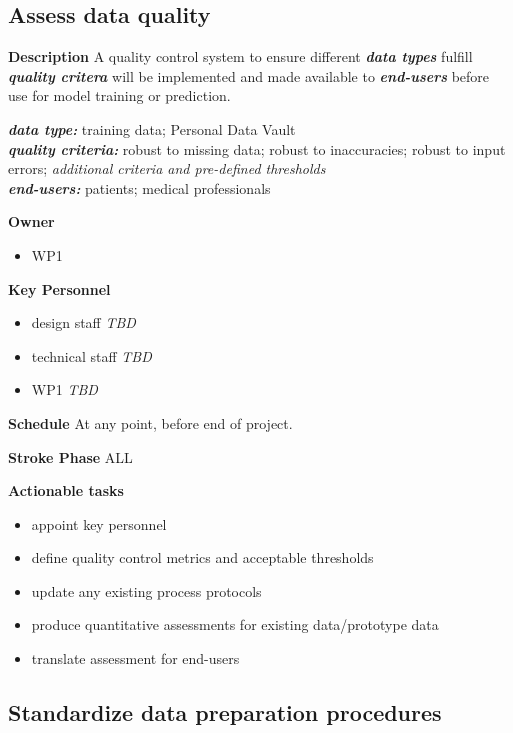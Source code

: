 \documentclass[
  letterpaper,
  DIV=11,
  numbers=noendperiod]{scrreport}
\providecommand{\tightlist}{%
  \setlength{\itemsep}{0pt}\setlength{\parskip}{0pt}}\usepackage{longtable,booktabs,array}
\begin{document}
\hypertarget{assess-data-quality}{%
\subsection{Assess data quality}\label{assess-data-quality}}

\textbf{Description} A quality control system to ensure different
\textbf{\emph{data types}} fulfill \textbf{\emph{quality critera}} will
be implemented and made available to \textbf{\emph{end-users}} before
use for model training or prediction.

\textbf{\emph{data type:}} training data; Personal Data Vault\\
\textbf{\emph{quality criteria:}} robust to missing data; robust to
inaccuracies; robust to input errors; \emph{additional criteria and
pre-defined thresholds}\\
\textbf{\emph{end-users:}} patients; medical professionals

\textbf{Owner}

\begin{itemize}
\tightlist
\item
  WP1
\end{itemize}

\textbf{Key Personnel}

\begin{itemize}
\tightlist
\item
  design staff \emph{TBD}
\item
  technical staff \emph{TBD}
\item
  WP1 \emph{TBD}
\end{itemize}

\textbf{Schedule} At any point, before end of project.

\textbf{Stroke Phase} ALL

\textbf{Actionable tasks}

\begin{itemize}
\tightlist
\item
  appoint key personnel
\item
  define quality control metrics and acceptable thresholds
\item
  update any existing process protocols
\item
  produce quantitative assessments for existing data/prototype data
\item
  translate assessment for end-users
\end{itemize}

\hypertarget{standardize-data-preparation-procedures}{%
\subsection{Standardize data preparation
procedures}\label{standardize-data-preparation-procedures}}
\end{document}
